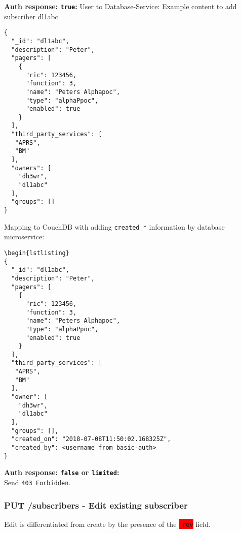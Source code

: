 \textbf{Auth response: \texttt{true}:}
User to Database-Service: Example content to add subscriber dl1abc
\begin{lstlisting}
{
  "_id": "dl1abc",
  "description": "Peter",
  "pagers": [
    {
      "ric": 123456,
      "function": 3,
      "name": "Peters Alphapoc",
      "type": "alphaPpoc",
      "enabled": true
    }
  ],
  "third_party_services": [
   "APRS",
   "BM"
  ],
  "owners": [
    "dh3wr",
    "dl1abc"
  ],
  "groups": []
}
\end{lstlisting}

Mapping to CouchDB with adding \verb|created_*| information by database microservice:\\
\begin{lstlisting}
\begin{lstlisting}
{
  "_id": "dl1abc",
  "description": "Peter",
  "pagers": [
    {
      "ric": 123456,
      "function": 3,
      "name": "Peters Alphapoc",
      "type": "alphaPpoc",
      "enabled": true
    }
  ],
  "third_party_services": [
   "APRS",
   "BM"
  ],
  "owner": [
    "dh3wr",
    "dl1abc"
  ],
  "groups": [],
  "created_on": "2018-07-08T11:50:02.168325Z",
  "created_by": <username from basic-auth>
}
\end{lstlisting}

\textbf{Auth response: \texttt{false} or \texttt{limited}:}\\
Send \verb|403 Forbidden|.

\newpage
\subsubsection{PUT /subscribers - Edit existing subscriber}
Edit is differentiated from create by the presence of the \colorbox{red}{\texttt{\_rev}} field.

